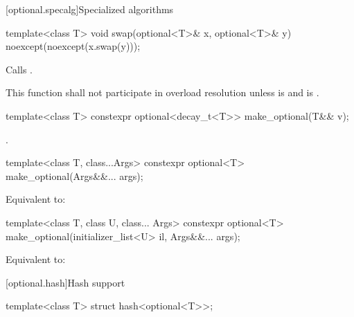 [optional.specalg]{Specialized algorithms}

%
\begin{itemdecl}
template<class T> void swap(optional<T>& x, optional<T>& y) noexcept(noexcept(x.swap(y)));
\end{itemdecl}

\begin{itemdescr}
\pnum
\effects
Calls .

\pnum
\remarks
This function shall not participate in overload resolution
unless  is  and
 is .
\end{itemdescr}

%
\begin{itemdecl}
template<class T> constexpr optional<decay_t<T>> make_optional(T&& v);
\end{itemdecl}

\begin{itemdescr}
\pnum
\returns
{}.
\end{itemdescr}

%
\begin{itemdecl}
template<class T, class...Args>
  constexpr optional<T> make_optional(Args&&... args);
\end{itemdecl}

\begin{itemdescr}
\pnum
\effects
Equivalent to: 
\end{itemdescr}

%
\begin{itemdecl}
template<class T, class U, class... Args>
  constexpr optional<T> make_optional(initializer_list<U> il, Args&&... args);
\end{itemdecl}

\begin{itemdescr}
\pnum
\effects
Equivalent to: 
\end{itemdescr}

[optional.hash]{Hash support}

%
\begin{itemdecl}
template<class T> struct hash<optional<T>>;
\end{itemdecl}

